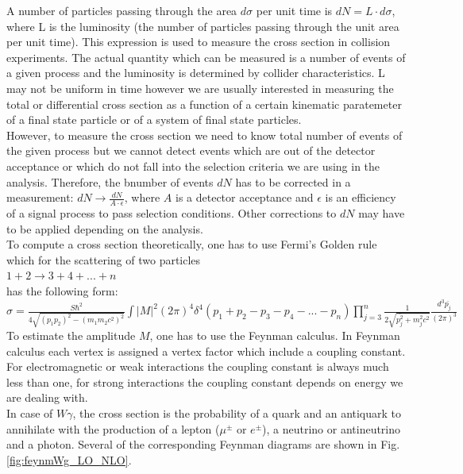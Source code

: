 A number of particles passing through the area $d\sigma$ per unit time is $dN=L \cdot d\sigma$, where L is the luminosity (the number of particles passing through the unit area per unit time). This expression is used to measure the cross section in collision experiments. The actual quantity which can be measured is a number of events of a given process and the luminosity is determined by collider characteristics. L may not be uniform in time however we are usually interested in measuring the total or differential cross section as a function of a certain kinematic paratemeter of a final state particle or of a system of final state particles.\\  
However, to measure the cross section we need to know total number of events of the given process but we cannot detect events which are out of the detector acceptance or which do not fall into the selection criteria we are using in the analysis. Therefore, the bnumber of events $dN$ has to be corrected in a measurement: $dN \rightarrow \frac{dN}{A \cdot \epsilon}$, where $A$ is a detector acceptance and $\epsilon$ is an efficiency of a signal process to pass selection conditions. Other corrections to $dN$ may have to be applied depending on the analysis.\\ 

To compute a cross section theoretically, one has to use Fermi's Golden rule which for the scattering of two particles\\
$1+2\rightarrow 3+4+...+n$\\
has the following form:\\

$\sigma = \frac{S \hbar^2 }{4\sqrt{(p_1p_2)^2-(m_1m_2c^2)^2}} \int |M|^2 (2\pi)^4 \delta^4(p_1+p_2-p_3-p_4-...-p_n) \prod_{j=3}^{n} \frac{1}{2 \sqrt{\bar{p_j^2}+m_j^2 c^2}}\frac{d^3\bar{p_j}}{(2\pi)^3} $\\

To estimate the amplitude $M$, one has to use the Feynman calculus. In Feynman calculus each vertex is assigned a vertex factor which include a coupling constant. For electromagnetic or weak interactions the coupling constant is always much less than one, for strong interactions the coupling constant depends on energy we are dealing with.  \\

In case of $W\gamma$, the cross section is the probability of a quark and an antiquark to annihilate with the production of a lepton ($\mu^{\pm}$ or $e^{\pm}$), a neutrino or antineutrino and a photon. Several of the corresponding Feynman diagrams are shown in Fig. \ref{fig:feynmWg_LO_NLO}. \\

